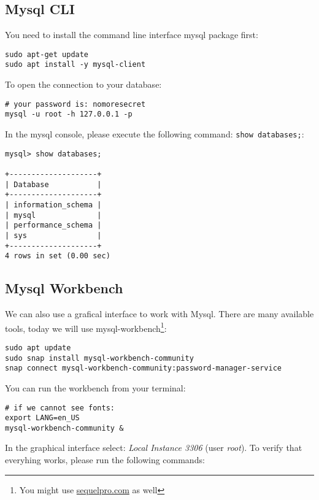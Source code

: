 \documentclass[12pt, letterpaper]{article}
\begin{document}
\subsection{Mysql {\small CLI}}

You need to install the command line interface mysql package first:

\begin{verbatim}
sudo apt-get update
sudo apt install -y mysql-client
\end{verbatim}

To open the connection to your database:

\begin{verbatim}
# your password is: nomoresecret
mysql -u root -h 127.0.0.1 -p
\end{verbatim}

In the mysql console, please execute the following command: \texttt{show databases;}:

\begin{verbatim}
mysql> show databases;

+--------------------+
| Database           |
+--------------------+
| information_schema |
| mysql              |
| performance_schema |
| sys                |
+--------------------+
4 rows in set (0.00 sec)
\end{verbatim}

\subsection{Mysql Workbench}

We can also use a grafical interface to work with Mysql. There are many available tools, today we will use mysql-workbench\footnote{You might use \href{https://sequelpro.com/download}{sequelpro.com} as well}:

\begin{verbatim}
sudo apt update
sudo snap install mysql-workbench-community
snap connect mysql-workbench-community:password-manager-service
\end{verbatim}

You can run the workbench from your terminal:

\begin{verbatim}
# if we cannot see fonts:
export LANG=en_US
mysql-workbench-community &
\end{verbatim}

In the graphical interface select: \emph{Local Instance 3306} (user \emph{root}). To verify that everyhing works, please run the following commands:
\end{document}
